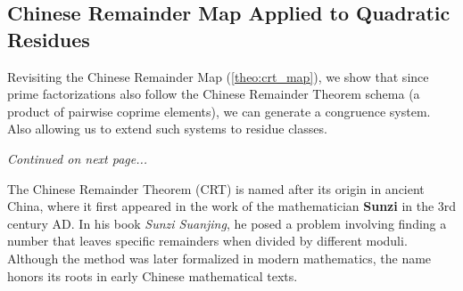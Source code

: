 \subsection{Chinese Remainder Map Applied to Quadratic Residues}
Revisiting the Chinese Remainder Map (\ref{theo:crt_map}), we show that since 
prime factorizations also follow the Chinese Remainder Theorem schema (a product of pairwise coprime elements),
we can generate a congruence system. Also allowing us to extend such systems to residue classes.
\vfill
\begin{center}
    \textit{Continued on next page...}
\end{center}
\vfill
\begin{Tip}
    The Chinese Remainder Theorem (CRT) is named after its origin in ancient China, where it first appeared in the work of the mathematician \textbf{Sunzi} in the 3rd century AD.
    In his book \textit{Sunzi Suanjing}, he posed a problem involving finding a number that leaves specific remainders when divided by different moduli. Although the method was later formalized in modern mathematics, the name honors its roots in early Chinese mathematical texts.
\end{Tip}

